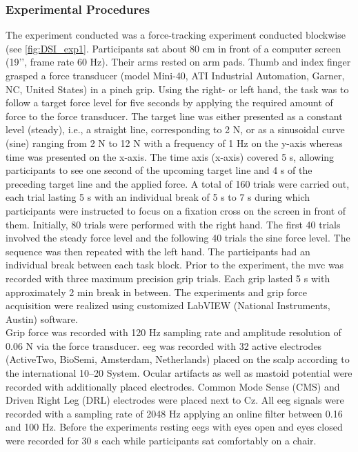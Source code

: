 \subsubsection{Experimental Procedures}
\label{methods:datasets:I:experiment}
The experiment conducted was a force-tracking experiment conducted blockwise (see \autoref{fig:DSI_exp1}. Participants sat about 80 cm in front of a computer screen (19’’, frame rate 60 Hz). Their arms rested on arm pads. Thumb and index finger grasped a force transducer (model Mini-40, ATI Industrial Automation, Garner, NC, United States) in a pinch grip. Using the right- or left hand, the task was to follow a target force level for five seconds by applying the required amount of force to the force transducer. The target line was either presented as a constant level (steady), i.e., a straight line, corresponding to 2 N, or as a sinusoidal curve (sine) ranging from 2 N to 12 N with a frequency of 1 Hz on the y-axis whereas time was presented on the x-axis. The time axis (x-axis) covered 5 s, allowing participants to see one second of the upcoming target line and 4 s of the preceding target line and the applied force. A total of 160 trials were carried out, each trial lasting 5 s with an individual break of 5 s to 7 s during which participants were instructed to focus on a fixation cross on the screen in front of them. Initially, 80 trials were performed with the right hand. The first 40 trials involved the steady force level and the following 40 trials the sine force level. The sequence was then repeated with the left hand. The participants had an individual break between each task block. Prior to the experiment, the \gls{mvc} was recorded with three maximum precision grip trials. Each grip lasted 5 s with approximately 2 min break in between. The experiments and grip force acquisition were realized using customized LabVIEW (National Instruments, Austin) software.\\
Grip force was recorded with 120 Hz sampling rate and amplitude resolution of 0.06 N via the force transducer.
\gls{eeg} was recorded with 32 active electrodes (ActiveTwo, BioSemi, Amsterdam, Netherlands) placed on the scalp according to the international 10–20 System. Ocular artifacts as well as mastoid potential were recorded with additionally placed electrodes. Common Mode Sense (CMS) and Driven Right Leg (DRL) electrodes were placed next to Cz. All \gls{eeg} signals were recorded with a sampling rate of 2048 Hz applying an online filter between 0.16 and 100 Hz. Before the experiments resting \glspl{eeg} with eyes open and eyes closed were recorded for 30 s each while participants sat comfortably on a chair.

